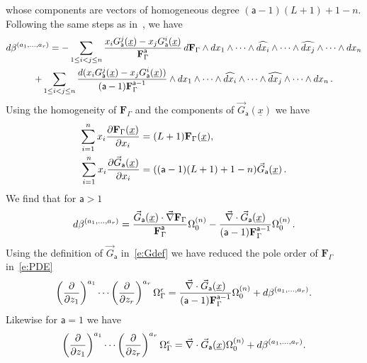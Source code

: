 \documentclass[a4paper,12pt]{article}
\numberwithin{equation}{section}
\numberwithin{figure}{section}
\begin{document}
whose components are vectors of homogeneous degree $(\mathsf{a}-1)(L+1)+1-n$. 
Following the same steps as in~\cite{Griffiths_1969}, we have
\begin{multline}
  d\beta^{(a_1,\dots,a_r)}=-  \sum_{1\leq i<j\leq n} {x_i
    G_{\mathsf{a}}^j  (\underline x)-x_j
   G_{\mathsf{a}}^i(\underline x)\over
   \textbf{F}_\Gamma^{\mathsf{a}}}\, d \textbf{F}_\Gamma\wedge
 dx_1\wedge \cdots \wedge \widehat{dx_i}\wedge \cdots \wedge\widehat{dx_j}\wedge
 \cdots \wedge dx_n \cr
+  \sum_{1\leq i<j\leq n} {d(x_i
    G_{\mathsf{a}}^j  (\underline x)-x_j
   G_{\mathsf{a}}^i(\underline x))\over
    (\mathsf{a}-1)\textbf{F}_\Gamma^{\mathsf{a}-1}}\wedge
 dx_1\wedge \cdots \wedge \widehat{dx_i}\wedge \cdots \wedge\widehat{dx_j}\wedge
  \cdots \wedge dx_n  \, .
\end{multline}
Using the homogeneity of $\mathbf{F}_\Gamma$ and the
components of $\vec G_{\mathsf{a}}(\underline x)$ we have
\begin{align}
  \sum_{i=1}^n x_i {\partial\mathbf{F}_\Gamma (\underline x)\over \partial x_i}&=
                                                                  (L+1) \mathbf{F}_\Gamma (\underline x),\\
   \sum_{i=1}^n x_i {\partial\vec G_{\mathsf{a}}(\underline x)\over \partial x_i}&=
                                                                  ((\mathsf{a}-1)(L+1)+1-n) \vec G_{\mathsf{a}}(\underline x) \,.
\end{align}
We find that for $\mathsf{a}>1$
   \begin{equation}
     d\beta^{(a_1,\dots,a_r)}= {  \vec  G_{\mathsf{a}}
     (\underline x)
\cdot    \vec \nabla\textbf{F}_\Gamma\over
     \textbf{F}_\Gamma^{\mathsf{a}}}\Omega_0^{(n)}-{
\vec\nabla \cdot \vec G_{\mathsf{a}}
     (\underline x)
    \over
    (\mathsf{a}-1)\textbf{F}_\Gamma^{\mathsf{a}-1}}
  \Omega_0^{(n)} \,.
\end{equation}
Using the definition of $\vec  G_{\mathsf{a}}$ in~\eqref{e:Gdef} we
have reduced the pole order  of $ \textbf{F}_\Gamma$ in~\eqref{e:PDE} 
\begin{equation}\label{e:RedG1}
\left(\partial\over \partial z_1\right)^{a_1}\cdots\left(\partial
  \over\partial z_r\right)^{a_r} \Omega_\Gamma^\epsilon={
\vec\nabla \cdot \vec G_{\mathsf{a}}
     (\underline x)
    \over
    (\mathsf{a}-1)\textbf{F}_\Gamma^{\mathsf{a}-1}}
  \Omega_0^{(n)}+d\beta^{(a_1,\dots,a_r)}.
\end{equation}
Likewise for $\mathsf{a}=1$ we have
\begin{equation}\label{e:RedG2}
    \left(\partial\over \partial z_1\right)^{a_1}\cdots\left(\partial
  \over\partial z_r\right)^{a_r} \Omega_\Gamma^\epsilon=
\vec\nabla \cdot \vec G_{\mathsf{a}}
     (\underline x)
  \Omega_0^{(n)}+d\beta^{(a_1,\dots,a_r)}.
\end{equation}
\end{document}
